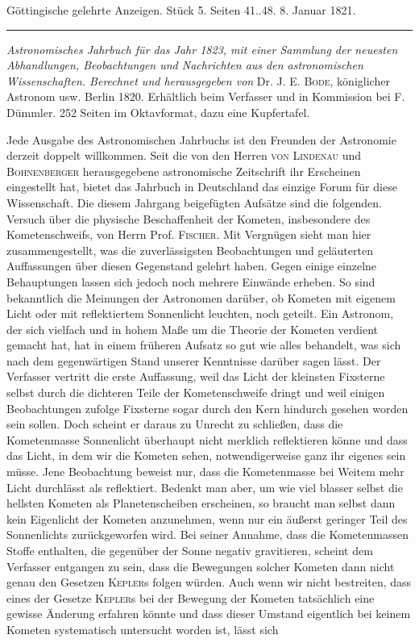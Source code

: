 \clearpage
{}
\hypertarget{native-630-lower}{}
\begin{center}\small Göttingische gelehrte Anzeigen. Stück 5. Seiten 41..48. 8. Januar 1821.\\[3pt]\rule{.72\linewidth}{.3pt}\end{center}

\emph{Astronomisches Jahrbuch für das Jahr \textup{1823}, mit einer Sammlung der neuesten Abhandlungen, Beobachtungen und Nachrichten aus den astronomischen Wissenschaften. Berechnet und herausgegeben von} Dr. J. E. \textsc{Bode}, königlicher Astronom usw. Berlin 1820. Erhältlich beim Verfasser und in Kommission bei F. Dümmler. 252 Seiten im Oktavformat, dazu eine Kupfertafel.

\begingroup{}\relax
Jede Ausgabe des Astronomischen Jahrbuchs ist den Freunden der Astronomie derzeit doppelt willkommen. Seit die von den Herren \textsc{von Lindenau} und \textsc{Bohnenberger} herausgegebene astronomische Zeitschrift ihr Erscheinen eingestellt hat, bietet das Jahrbuch in Deutschland das einzige Forum für diese Wissenschaft. Die diesem Jahrgang beigefügten Aufsätze sind die folgenden. Versuch über die physische Beschaffenheit der Kometen, insbesondere des Kometenschweifs, von Herrn Prof. \textsc{Fischer}. Mit Vergnügen sieht man hier zusammengestellt, was die zuverlässigsten Beobachtungen und geläuterten Auffassungen über diesen Gegenstand gelehrt haben. Gegen einige einzelne Behauptungen lassen sich jedoch noch mehrere Einwände erheben. So sind bekanntlich die Meinungen der Astronomen darüber, ob Kometen mit eigenem Licht oder mit reflektiertem Sonnenlicht leuchten, noch geteilt. Ein Astronom, der sich vielfach und in hohem Maße um die Theorie der Kometen verdient gemacht hat, hat in einem früheren Aufsatz so gut wie alles behandelt, was sich nach dem gegenwärtigen Stand unserer Kenntnisse darüber sagen lässt. Der Verfasser vertritt die erste Auffassung, weil das Licht der kleinsten Fixsterne selbst durch die dichteren Teile der Kometenschweife dringt und weil einigen Beobachtungen zufolge Fixsterne sogar durch den Kern hindurch gesehen worden sein sollen. Doch scheint er daraus zu Unrecht zu schließen, dass die Kometenmasse Sonnenlicht überhaupt nicht merklich reflektieren könne und dass das Licht, in dem wir die Kometen sehen, notwendigerweise ganz ihr eigenes sein müsse. Jene Beobachtung beweist nur, dass die Kometenmasse bei Weitem mehr Licht durchlässt als reflektiert. Bedenkt man aber, um wie viel blasser selbst die hellsten Kometen als Planetenscheiben erscheinen, so braucht man selbst dann kein Eigenlicht der Kometen anzunehmen, wenn nur ein äußerst geringer Teil des Sonnenlichts zurückgeworfen wird. Bei seiner Annahme, dass die Kometenmassen Stoffe enthalten, die gegenüber der Sonne negativ gravitieren, scheint dem Verfasser entgangen zu sein, dass die Bewegungen solcher Kometen dann nicht genau den Gesetzen \textsc{Kepler}s folgen würden. Auch wenn wir nicht bestreiten, dass eines der Gesetze \textsc{Kepler}s bei der Bewegung der Kometen tatsächlich eine gewisse Änderung erfahren könnte und dass dieser Umstand eigentlich bei keinem Kometen systematisch untersucht worden ist, lässt sich 